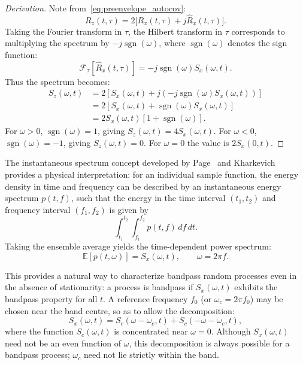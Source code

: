 \documentclass[12pt]{article}
\begin{document}
\begin{proof}[Derivation]
Note from~\eqref{eq:preenvelope_autocov}:
\[
R_z(t, \tau) = 2 \big[ R_x(t, \tau) + j \hat{R}_x(t, \tau) \big].
\]
Taking the Fourier transform in $\tau$, the Hilbert transform in $\tau$ corresponds to multiplying the spectrum by $-j \operatorname{sgn}(\omega)$, where $\operatorname{sgn}(\omega)$ denotes the sign function:
\[
\mathcal{F}_\tau [ \hat{R}_x(t, \tau) ] = -j \operatorname{sgn}(\omega) S_x(\omega, t).
\]
Thus the spectrum becomes:
\begin{align*}
S_z(\omega, t) &= 2 \left[ S_x(\omega, t) + j (-j \operatorname{sgn}(\omega) S_x(\omega, t)) \right] \\
&= 2 \left[ S_x(\omega, t) + \operatorname{sgn}(\omega) S_x(\omega, t) \right] \\
&= 2 S_x(\omega, t) \left[1 + \operatorname{sgn}(\omega) \right].
\end{align*}
For $\omega > 0$, $\operatorname{sgn}(\omega) = 1$, giving $S_z(\omega, t) = 4 S_x(\omega, t)$. For $\omega < 0$, $\operatorname{sgn}(\omega) = -1$, giving $S_z(\omega, t) = 0$. For $\omega = 0$ the value is $2 S_x(0, t)$.
\end{proof}

The instantaneous spectrum concept developed by Page~\cite{page1952} and Kharkevich~\cite{kharkevich1960}
provides a physical interpretation: for an individual sample function, the energy density in time and frequency can be described by an instantaneous energy spectrum $p(t, f)$, such that the energy in the time interval $(t_1, t_2)$ and frequency interval $(f_1, f_2)$ is given by
\begin{equation}
\int_{t_1}^{t_2} \int_{f_1}^{f_2} p(t, f) \, df \, dt.
\end{equation}
Taking the ensemble average yields the time-dependent power spectrum:
\begin{equation}
\mathbb{E}[p(t, \omega)] = S_x(\omega, t), \qquad \omega = 2\pi f.
\end{equation}

\noindent
This provides a natural way to characterize bandpass random processes even in the absence of stationarity: a process is bandpass if $S_x(\omega, t)$ exhibits the bandpass property for all $t$. A reference frequency $f_0$ (or $\omega_c = 2\pi f_0$) may be chosen near the band centre, so as to allow the decomposition:
\begin{equation}
S_x(\omega, t) = S_c(\omega - \omega_c, t) + S_c(-\omega - \omega_c, t),
\label{eq:bandpass_spectrum}
\end{equation}
where the function $S_c(\omega, t)$ is concentrated near $\omega = 0$. Although $S_x(\omega, t)$ need not be an even function of $\omega$, this decomposition is always possible for a bandpass process; $\omega_c$ need not lie strictly within the band.
\end{document}
